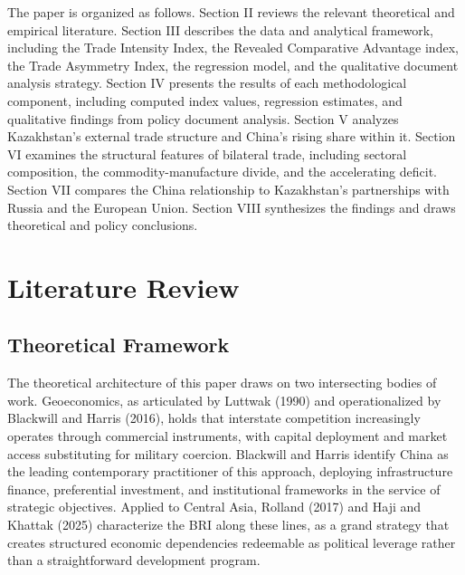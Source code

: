 \documentclass[12pt]{article}
\begin{document}
The paper is organized as follows. Section II reviews the relevant theoretical and empirical literature. Section III describes the data and analytical framework, including the Trade Intensity Index, the Revealed Comparative Advantage index, the Trade Asymmetry Index, the regression model, and the qualitative document analysis strategy. Section IV presents the results of each methodological component, including computed index values, regression estimates, and qualitative findings from policy document analysis. Section V analyzes Kazakhstan's external trade structure and China's rising share within it. Section VI examines the structural features of bilateral trade, including sectoral composition, the commodity-manufacture divide, and the accelerating deficit. Section VII compares the China relationship to Kazakhstan's partnerships with Russia and the European Union. Section VIII synthesizes the findings and draws theoretical and policy conclusions.

\section{Literature Review}

\subsection{Theoretical Framework}

The theoretical architecture of this paper draws on two intersecting bodies of work. Geoeconomics, as articulated by Luttwak (1990) and operationalized by Blackwill and Harris (2016), holds that interstate competition increasingly operates through commercial instruments, with capital deployment and market access substituting for military coercion. Blackwill and Harris identify China as the leading contemporary practitioner of this approach, deploying infrastructure finance, preferential investment, and institutional frameworks in the service of strategic objectives. Applied to Central Asia, Rolland (2017) and Haji and Khattak (2025) characterize the BRI along these lines, as a grand strategy that creates structured economic dependencies redeemable as political leverage rather than a straightforward development program.
\end{document}
